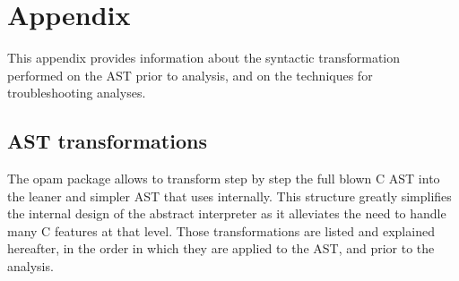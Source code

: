 \appendix
\chapter{Appendix}

This appendix provides information about the syntactic transformation
performed on the AST prior to analysis, and on the techniques for
troubleshooting analyses.

\section{AST transformations}
The opam package  allows to transform step by
step the full blown  C AST into the leaner and simpler AST
that \memcad uses internally.
This structure greatly simplifies the internal design of the abstract
interpreter as it alleviates the need to handle many C features at that
level.
Those transformations are listed and explained hereafter, in the order
in which they are applied to the  AST, and prior to the
analysis.
